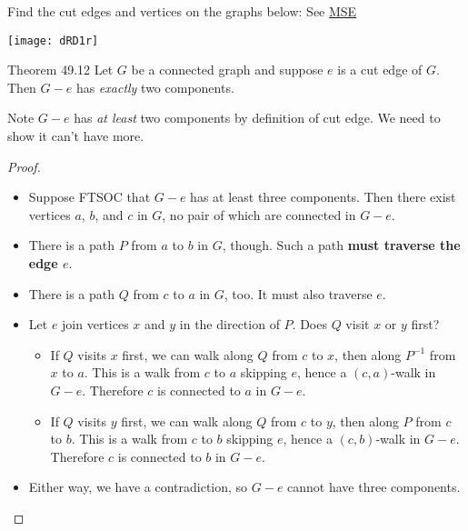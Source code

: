 \documentclass
[ignorenonframetext,14pt,aspectratio=169]
{ngelessonslides}
\begin{document}
\begin{example}
Find the cut edges and vertices on the graphs below:
See \href{https://math.stackexchange.com/q/457159/2785}{MSE}
\begin{center}
\texttt{[image: dRD1r]}
\end{center}
\end{example}

\begin{frame}[label=cut-thm]
    \begin{block}{Theorem 49.12}
   Let $G$ be a connected graph and suppose $e$ is a cut edge of $G$.
   Then $G-e$ has \emph{exactly} two components.
   \end{block}
   Note $G-e$ has \emph{at least} two components by definition of cut edge.
   We need to show it can't have more.
\end{frame}

\begin{frame}[label=cut-proof]
\begin{proof}
\begin{overlayarea}{\textwidth}{0.8\textheight}
\begin{itemize}
\item<only@1-4|uncover@+-> Suppose FTSOC that $G-e$ has at least three components.  Then there exist vertices $a$, $b$, and $c$ in $G$,
no pair of which are connected in $G-e$.
\item<only@1-4|uncover@+-> There is a path $P$ from $a$ to $b$ in $G$, though.  Such a path \textbf{must traverse the edge $e$}.
\item<only@1-4|uncover@+-> There is a path $Q$ from $c$ to $a$ in $G$, too.  It must also traverse $e$.
\item<uncover@+-> Let $e$ join vertices $x$ and $y$ in the direction of $P$.  Does $Q$ visit $x$ or $y$ first?
\begin{itemize}
\item<uncover@+-> If $Q$ visits $x$ first, we can walk along $Q$ from $c$ to $x$, then along $P^{-1}$ from $x$ to $a$.
    This is a walk from $c$ to $a$ skipping $e$, hence a $(c,a)$-walk in $G-e$.  Therefore $c$ is connected to $a$ in $G-e$.
    \raa
\item<uncover@+-> If $Q$ visits $y$ first, we can walk along $Q$ from $c$ to $y$, then along $P$ from $c$ to $b$.
    This is a walk from $c$ to $b$ skipping $e$, hence a $(c,b)$-walk in $G-e$.  Therefore $c$ is connected to $b$ in $G-e$.
    \raa
\end{itemize}
\item<uncover@+-> Either way, we have a contradiction, so $G-e$ cannot have three components.\qedhere
\end{itemize}

\end{overlayarea}\end{proof}
\end{frame}
\end{document}
